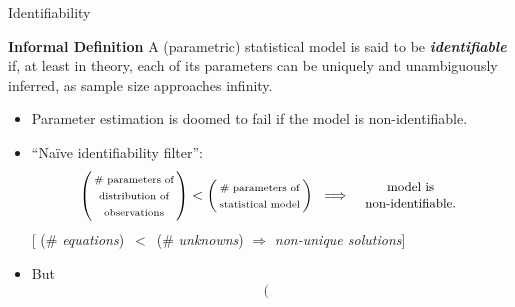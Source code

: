 \begin{frame}{\vskip -0.2cm \LARGE Identifiability}

\vskip 0.0cm
\textbf{Informal Definition}
\vskip 0.025cm
A (parametric) statistical model is said to be \emph{\textbf{identifiable}} if, at least in theory, each of its
parameters can be uniquely and unambiguously inferred, as sample size approaches infinity.

\vskip 0.2cm

\footnotesize
\begin{itemize}
\pause\item
	Parameter estimation is {\color{red}doomed to fail} if the model is non-identifiable.
	\vskip 0.01cm
	\vskip 0.2cm
\pause\item
	``Na\"ive identifiability filter'':
	\vskip -0.4cm
	\begin{equation*}
	\left(\!\!\begin{array}{c}
		\textnormal{\scriptsize \# parameters of} \\
		\textnormal{\scriptsize distribution of} \\
		\textnormal{\scriptsize observations}
	\end{array}\!\!\right)
	<
	\left(\!\!\begin{array}{c}
		\textnormal{\scriptsize \# parameters of} \\
		\textnormal{\scriptsize statistical model}
	\end{array}\!\!\right)
	\;\;\Longrightarrow\;\;
	\begin{array}{c}
		\textnormal{\small model is} \\
		\textnormal{\small non-identifiable.}
	\end{array}
	\end{equation*}
	\pause
	{[\; (\# \textit{equations}) \,$<$\, (\# \textit{unknowns}) \;$\Longrightarrow$\; \textit{non-unique solutions}\;]}
	\vskip 0.3cm
\pause\item
	But \tiny 
	\vskip -0.5cm
	\begin{equation*}
	\left(\!\!\begin{array}{c}

\end{array}
\end{equation*}
\end{itemize}
\end{frame}
